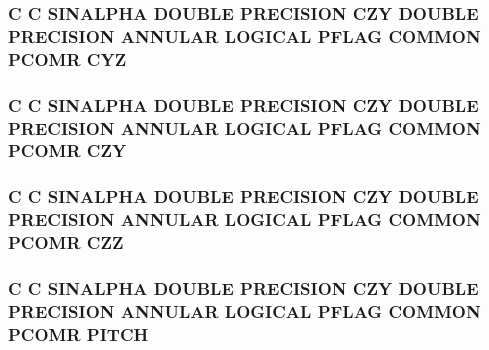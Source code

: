 \hypertarget{periodic_8com_a6598de5f1ee82a5816b02138d3b68272}{
\subsubsection[{C\-Y\-Z}]{\setlength{\rightskip}{0pt plus 5cm}C C {\bf S\-I\-N\-A\-L\-P\-H\-A} D\-O\-U\-B\-L\-E P\-R\-E\-C\-I\-S\-I\-O\-N {\bf C\-Z\-Y} D\-O\-U\-B\-L\-E P\-R\-E\-C\-I\-S\-I\-O\-N {\bf A\-N\-N\-U\-L\-A\-R} L\-O\-G\-I\-C\-A\-L {\bf P\-F\-L\-A\-G} C\-O\-M\-M\-O\-N P\-C\-O\-M\-R C\-Y\-Z}}\label{periodic_8com_a6598de5f1ee82a5816b02138d3b68272}
\hypertarget{periodic_8com_adb297821c3d32421de02ebdcccf54496}{
\subsubsection[{C\-Z\-Y}]{\setlength{\rightskip}{0pt plus 5cm}C C {\bf S\-I\-N\-A\-L\-P\-H\-A} D\-O\-U\-B\-L\-E P\-R\-E\-C\-I\-S\-I\-O\-N C\-Z\-Y D\-O\-U\-B\-L\-E P\-R\-E\-C\-I\-S\-I\-O\-N {\bf A\-N\-N\-U\-L\-A\-R} L\-O\-G\-I\-C\-A\-L {\bf P\-F\-L\-A\-G} C\-O\-M\-M\-O\-N P\-C\-O\-M\-R C\-Z\-Y}}\label{periodic_8com_adb297821c3d32421de02ebdcccf54496}
\hypertarget{periodic_8com_aa7bcfd7f2b578501797a2b6dd051182c}{
\subsubsection[{C\-Z\-Z}]{\setlength{\rightskip}{0pt plus 5cm}C C {\bf S\-I\-N\-A\-L\-P\-H\-A} D\-O\-U\-B\-L\-E P\-R\-E\-C\-I\-S\-I\-O\-N {\bf C\-Z\-Y} D\-O\-U\-B\-L\-E P\-R\-E\-C\-I\-S\-I\-O\-N {\bf A\-N\-N\-U\-L\-A\-R} L\-O\-G\-I\-C\-A\-L {\bf P\-F\-L\-A\-G} C\-O\-M\-M\-O\-N P\-C\-O\-M\-R C\-Z\-Z}}\label{periodic_8com_aa7bcfd7f2b578501797a2b6dd051182c}
\hypertarget{periodic_8com_a561a55de399868c8c1a3a96eb4417f38}{
\subsubsection[{P\-I\-T\-C\-H}]{\setlength{\rightskip}{0pt plus 5cm}C C {\bf S\-I\-N\-A\-L\-P\-H\-A} D\-O\-U\-B\-L\-E P\-R\-E\-C\-I\-S\-I\-O\-N {\bf C\-Z\-Y} D\-O\-U\-B\-L\-E P\-R\-E\-C\-I\-S\-I\-O\-N {\bf A\-N\-N\-U\-L\-A\-R} L\-O\-G\-I\-C\-A\-L {\bf P\-F\-L\-A\-G} C\-O\-M\-M\-O\-N P\-C\-O\-M\-R P\-I\-T\-C\-H}}\label{periodic_8com_a561a55de399868c8c1a3a96eb4417f38}
